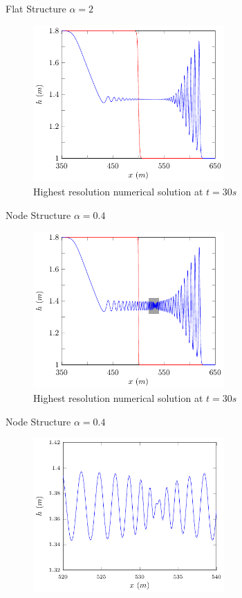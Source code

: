 \documentclass[pdf]{beamer}
\begin{document}
\begin{frame}{Flat Structure $\alpha = 2$}
	\begin{figure}
		\includegraphics[width=0.65\textwidth]{./Pictures/Results/Example/flate.pdf}
		\caption{Highest resolution numerical solution at $t=30s$}
	\end{figure}
\end{frame}
\begin{frame}{Node Structure $\alpha = 0.4$}
	\begin{figure}
		\includegraphics[width=0.65\textwidth]{./Pictures/Results/Example/node.pdf}
		\caption{Highest resolution numerical solution at $t=30s$}
	\end{figure}
\end{frame}

\begin{frame}{Node Structure $\alpha = 0.4$}
	\begin{figure}
		\includegraphics[width=0.65\textwidth]{./Pictures/Results/Example/nodez.pdf}
	\end{figure}
\end{frame}
\end{document}
